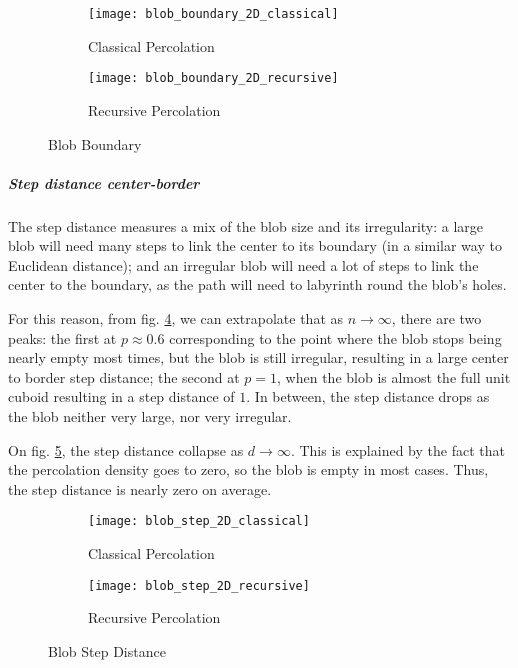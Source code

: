 \begin{figure}[!h]
	\centering
	\begin{subfigure}{.49\textwidth}
		\texttt{[image: blob\_boundary\_2D\_classical]}
		\centering
		\caption{Classical Percolation}
		\label{fig:blobBoundaryClassical}
	\end{subfigure}
	\begin{subfigure}{.49\textwidth}
		\texttt{[image: blob\_boundary\_2D\_recursive]}
		\centering
		\caption{Recursive Percolation}
		\label{fig:blobBoundaryRecursive}
	\end{subfigure}
	\caption{Blob Boundary}
	\label{fig:blobBoundary}
\end{figure}


\subparagraph{Step distance center-border}
The step distance measures a mix of the blob size and its irregularity: a large blob will need many steps to link the center to its boundary (in a similar way to Euclidean distance); and an irregular blob will need a lot of steps to link the center to the boundary, as the path will need to labyrinth round the blob's holes.

For this reason, from fig. \ref{fig:blobStepDistanceClassical}, we can extrapolate that as $n \to \infty$, there are two peaks: the first at $p \approx 0.6$ corresponding to the point where the blob stops being nearly empty most times, but the blob is still irregular, resulting in a large center to border step distance; the second at $p = 1$, when the blob is almost the full unit cuboid resulting in a step distance of $1$.
In between, the step distance drops as the blob neither very large, nor very irregular.

On fig. \ref{fig:blobStepDistanceRecursive}, the step distance collapse as $d \to \infty$.
This is explained by the fact that the percolation density goes to zero, so the blob is empty in most cases.
Thus, the step distance is nearly zero on average.

\begin{figure}[!h]
	\centering
	\begin{subfigure}{.49\textwidth}
		\texttt{[image: blob\_step\_2D\_classical]}
		\centering
		\caption{Classical Percolation}
		\label{fig:blobStepDistanceClassical}
	\end{subfigure}
	\begin{subfigure}{.49\textwidth}
		\texttt{[image: blob\_step\_2D\_recursive]}
		\centering
		\caption{Recursive Percolation}
		\label{fig:blobStepDistanceRecursive}
	\end{subfigure}
	\caption{Blob Step Distance}
	\label{fig:blobStepDistance}
\end{figure}



